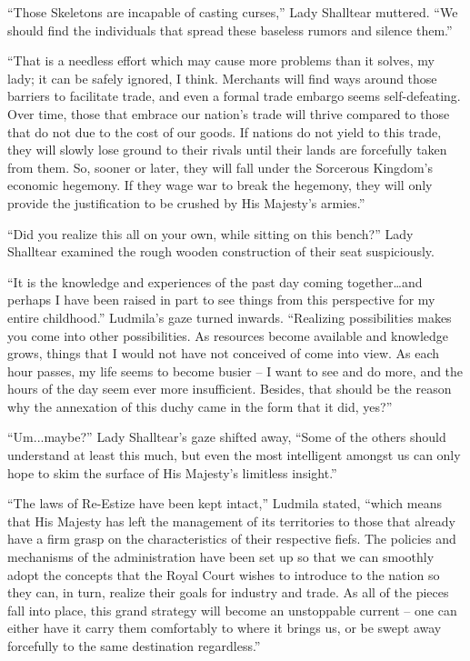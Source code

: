  

“Those Skeletons are incapable of casting curses,” Lady Shalltear muttered. “We should find the individuals that spread these baseless rumors and silence them.”

 

“That is a needless effort which may cause more problems than it solves, my lady; it can be safely ignored, I think. Merchants will find ways around those barriers to facilitate trade, and even a formal trade embargo seems self-defeating. Over time, those that embrace our nation’s trade will thrive compared to those that do not due to the cost of our goods. If nations do not yield to this trade, they will slowly lose ground to their rivals until their lands are forcefully taken from them. So, sooner or later, they will fall under the Sorcerous Kingdom’s economic hegemony. If they wage war to break the hegemony, they will only provide the justification to be crushed by His Majesty’s armies.”

 

“Did you realize this all on your own, while sitting on this bench?” Lady Shalltear examined the rough wooden construction of their seat suspiciously.

 

“It is the knowledge and experiences of the past day coming together…and perhaps I have been raised in part to see things from this perspective for my entire childhood.” Ludmila’s gaze turned inwards. “Realizing possibilities makes you come into other possibilities. As resources become available and knowledge grows, things that I would not have not conceived of come into view. As each hour passes, my life seems to become busier – I want to see and do more, and the hours of the day seem ever more insufficient. Besides, that should be the reason why the annexation of this duchy came in the form that it did, yes?”

 

“Um...maybe?” Lady Shalltear’s gaze shifted away, “Some of the others should understand at least this much, but even the most intelligent amongst us can only hope to skim the surface of His Majesty’s limitless insight.”

 

“The laws of Re-Estize have been kept intact,” Ludmila stated, “which means that His Majesty has left the management of its territories to those that already have a firm grasp on the characteristics of their respective fiefs. The policies and mechanisms of the administration have been set up so that we can smoothly adopt the concepts that the Royal Court wishes to introduce to the nation so they can, in turn, realize their goals for industry and trade. As all of the pieces fall into place, this grand strategy will become an unstoppable current – one can either have it carry them comfortably to where it brings us, or be swept away forcefully to the same destination regardless.”

